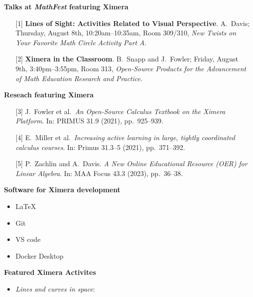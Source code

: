 \documentclass[twocolumn]{article}
\begin{document}
\begin{xframe}
    {\sffamily\bfseries Talks at \textsl{MathFest} featuring Ximera}
    \begin{itemize}
        \item[{[1]}] \textbf{Lines of Sight: Activities Related to Visual
            Perspective}. A.\ Davis; Thursday, August 8th,
        10:20am--10:35am,
        Room 309/310,
        \textit{New Twists on Your Favorite Math Circle Activity Part A}.
        \item[{[2]}] \textbf{Ximera in the Classroom}. B.\ Snapp and J.\
        Fowler;
        Friday, August 9th, 3:40pm--3:55pm, Room 313, \textit{Open-Source
            Products for
            the Advancement of Math Education Research and Practice}.
    \end{itemize}
\end{xframe}
\restoregeometry

\begin{xframe}
    {\sffamily\bfseries Reseach featuring Ximera}
    \begin{itemize}
        \item[{[3]}] J.\ Fowler et al.\ \textit{An Open-Source Calculus
            Textbook on the Ximera Platform}. In:
        PRIMUS 31.9 (2021), pp.\ 925--939. %
        \item[{[4]}] E.\ Miller et al.\ \textit{Increasing active learning
            in large, tightly coordinated
            calculus courses}.
        In: Primus 31.3--5 (2021), pp.\ 371--392.
        \item[{[5]}] P.\ Zachlin and A.\ Davis. \textit{A New Online
            Educational Resource (OER)
            for Linear Algebra}. In: MAA Focus 43.3 (2023), pp.\ 36--38.
    \end{itemize}
\end{xframe}

\begin{xframe}
    {\sffamily\bfseries Software for Ximera development}
    \begin{itemize}
        \item \LaTeX\
        \item Git
        \item VS code
        \item Docker Desktop
    \end{itemize}
\end{xframe}

\begin{xframe}
    {\sffamily\bfseries Featured Ximera Activites}
    \begin{itemize}
        \item \textit{Lines and curves in space}:
              \qrcode{https://go.osu.edu/lcs}
    \end{itemize}
\end{xframe}
\end{document}
